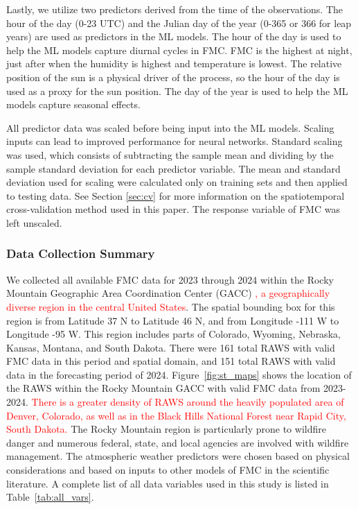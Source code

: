 \documentclass[fire,article,submit,pdftex,moreauthors]{Definitions/mdpi}
\begin{document}
Lastly, we utilize two predictors derived from the time of the observations. The hour of the day (0-23 UTC) and the Julian day of the year (0-365 or 366 for leap years) are used as predictors in the ML models. The hour of the day is used to help the ML models capture diurnal cycles in FMC. FMC is the highest at night, just after when the humidity is highest and temperature is lowest. The relative position of the sun is a physical driver of the process, so the hour of the day is used as a proxy for the sun position. The day of the year is used to help the ML models capture seasonal effects.

All predictor data was scaled before being input into the ML models. Scaling inputs can lead to improved performance for neural networks. Standard scaling was used, which consists of subtracting the sample mean and dividing by the sample standard deviation for each predictor variable. The mean and standard deviation used for scaling were calculated only on training sets and then applied to testing data. See Section \ref{sec:cv} for more information on the spatiotemporal cross-validation method used in this paper. The response variable of FMC was left unscaled.
\subsubsection{Data Collection Summary}
We collected all available FMC data for 2023 through 2024 within the Rocky Mountain Geographic Area Coordination Center (GACC) \textcolor{red}{, a geographically diverse region in the central United States}. The spatial bounding box for this region is from Latitude 37 N to Latitude 46 N, and from Longitude -111 W to Longitude -95 W. This region includes parts of Colorado, Wyoming, Nebraska, Kansas, Montana, and South Dakota. There were 161 total RAWS with valid FMC data in this period and spatial domain, and 151 total RAWS with valid data in the forecasting period of 2024. Figure~\ref{fig:st_maps} shows the location of the RAWS within the Rocky Mountain GACC with valid FMC data from 2023-2024. \textcolor{red}{There is a greater density of RAWS around the heavily populated area of Denver, Colorado, as well as in the Black Hills National Forest near Rapid City, South Dakota.} The Rocky Mountain region is particularly prone to wildfire danger and numerous federal, state, and local agencies are involved with wildfire management. The atmospheric weather predictors were chosen based on physical considerations and based on inputs to other models of FMC in the scientific literature. A complete list of all data variables used in this study is listed in Table~\ref{tab:all_vars}.
\end{document}
